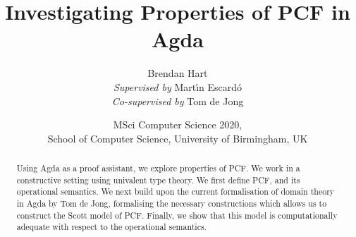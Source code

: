 \documentclass[11pt]{article}
\theoremstyle{definition}
\theoremstyle{remark}
\begin{document}
\title{Investigating Properties of PCF in Agda}
\author{Brendan Hart \\
  \emph{Supervised by } Mart\'{\i}n Escard\'o \\
  \emph{Co-supervised by } Tom de Jong
}
\date{MSci Computer Science 2020, \\ School of Computer Science, University of Birmingham, UK}

\maketitle

\begin{abstract}
Using Agda as a proof assistant, we explore properties of PCF. We work in a constructive setting using univalent type theory. We first define PCF, and its operational semantics. We next build upon the current formalisation of domain theory in Agda by Tom de Jong, formalising the necessary constructions which allows us to construct the Scott model of PCF. Finally, we show that this model is computationally adequate with respect to the operational semantics.
\end{abstract}


\begin{multicols}{2}
  \begin{small}
  {\hypersetup{linkcolor=black}
  \tableofcontents}
  \end{small}
\end{multicols}

\newpage








 
 
 

\renewcommand{\bibfont}{\normalfont\footnotesize}
\printbibliography

\newpage
\begin{appendices}
  }
   
\end{appendices}
\end{document}
